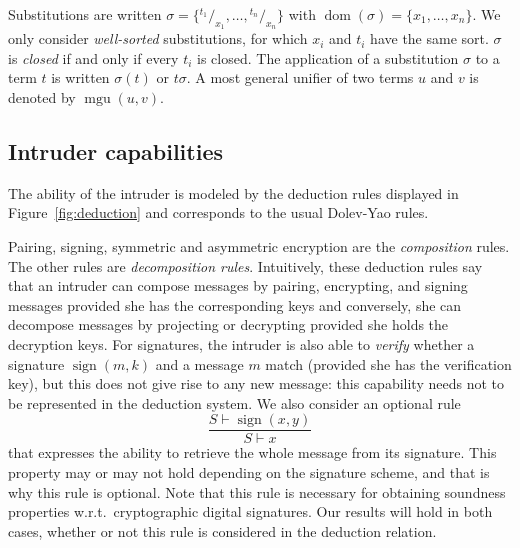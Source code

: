 \documentclass[acmtocl,acmnow]{acmtrans2m}
\newcommand{\dom}{\operatorname{dom}}
\newcommand{\mgu}{\operatorname{mgu}}
\newcommand{\subst}[2]{{}^{#2}\!/_{\!#1}}
\newcommand{\sign}{\operatorname{sign}}
\begin{document}
Substitutions are written $\sigma = \{ \subst{x_1}{t_1} ,\ldots, \subst{x_n}{t_n} \}$ with $\dom(\sigma)
= \{ x_1,\ldots,x_n\}$. We only consider \emph{well-sorted} substitutions, 
for which $x_i$ and $t_i$ have the same sort. $\sigma$ is \emph{closed} if and only if every $t_i$ is
closed.
The application of a substitution $\sigma$ to a term $t$ is written $\sigma(t)$ or $t\sigma$.
A {most general unifier} of two terms $u$ and $v$ is denoted by $\mgu(u,v)$.





\subsection{Intruder capabilities}
The ability of the intruder is modeled by the deduction rules
displayed in Figure~\ref{fig:deduction} and corresponds to the usual
Dolev-Yao rules. 

Pairing, signing, symmetric and asymmetric encryption are the \emph{composition}
rules. The other rules are \emph{decomposition rules}.
Intuitively, these deduction rules say that an intruder can compose
messages by pairing, encrypting, and signing messages provided she has
the corresponding keys and conversely, she can decompose messages by
projecting or decrypting provided she holds the decryption keys. For
signatures, the intruder is also able to \emph{verify} whether a
signature $\sign(m,k)$ and a message $m$ match (provided she has the
verification key), but this does not give rise to any new message: 
 this capability needs not to be represented in the deduction system.
We also consider an optional rule
\[
\frac{S\vdash \sign(x,y)}{S\vdash
x}
\]
that expresses the ability to retrieve the whole message from
its signature. This property may or may not hold depending on the
signature scheme, and that is why this rule is optional. Note that
this rule is necessary for
obtaining soundness properties w.r.t.~cryptographic digital signatures. Our
results will hold in both cases,
whether or not this rule is considered in the deduction relation.
\end{document}
